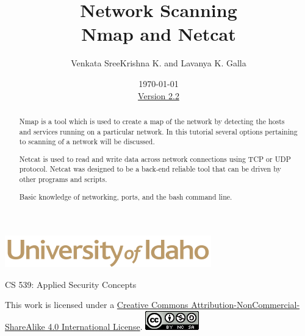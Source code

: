 \documentclass[12pt]{extarticle}
\begin{document}
\title{ Network Scanning \\ \large Nmap and Netcat}
\author{Venkata SreeKrishna K. and Lavanya K. Galla}
\date{\today \\ \hyperref[changelog]{Version 2.2}} %
\renewcommand{\abstractname}{Executive Summary}
\begin{titlepage}
\maketitle
\keepthetitle %
\begin{center}
\includegraphics[scale=.5]{UofI}

\large{CS 539: Applied Security Concepts}

\vskip 40pt

\end{center}
\begin{abstract}
Nmap is a tool which is used to create a map of the network by detecting the hosts and services running on a particular network. In this tutorial several options pertaining to scanning of a network will be discussed.

Netcat is used to read and write data across network connections using TCP or UDP protocol. Netcat was designed to be a back-end reliable tool that can be driven by other programs and scripts.


Basic knowledge of networking, ports, and the bash command line.
\end{abstract}


\vfill
\begin{center}
This work is licensed under a \href{https://creativecommons.org/licenses/by-nc-sa/4.0/legalcode}{Creative Commons Attribution-NonCommercial-ShareAlike 4.0 International License}.
\vskip 10pt
\includegraphics[scale=.5]{cc}
\end{center}

\end{titlepage}


\pagebreak
\tableofcontents
\end{document}

